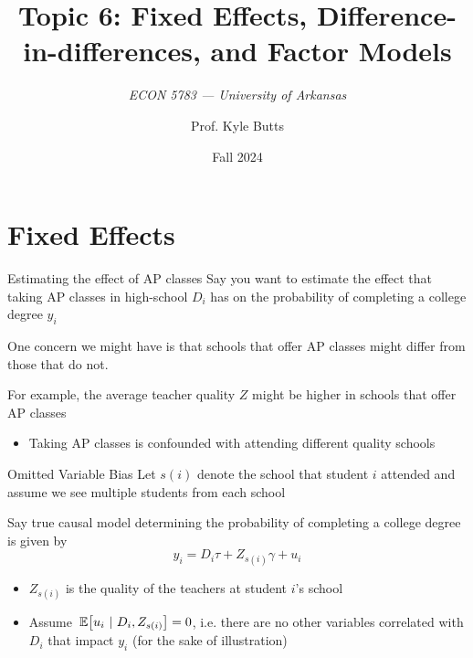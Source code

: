 \documentclass[aspectratio=169,t,11pt,table]{beamer}
\title{Topic 6: Fixed Effects, Difference-in-differences, and Factor Models}
\subtitle{\it  ECON 5783 — University of Arkansas}
\date{Fall 2024}
\author{Prof. Kyle Butts}
\begin{document}
\begin{frame}
\maketitle

\end{frame}

\section{Fixed Effects}

\begin{frame}{Estimating the effect of AP classes}
  Say you want to estimate the effect that taking AP classes in high-school $D_i$ has on the probability of completing a college degree $y_i$
  
  \bigskip
  One concern we might have is that schools that offer AP classes might differ from those that do not. 
  
  \pause
  \bigskip
  For example, the average teacher quality $Z$ might be higher in schools that offer AP classes
  \begin{itemize}
    \item Taking AP classes is confounded with attending different quality schools
  \end{itemize}
\end{frame}

\begin{frame}{Omitted Variable Bias}
  Let $s(i)$ denote the school that student $i$ attended and assume we see multiple students from each school

  \pause
  \bigskip
  Say true causal model determining the probability of completing a college degree is given by
  $$
    y_i = D_i \tau + Z_{s(i)} \gamma + u_i
  $$
  
  \begin{itemize}
    \item $Z_{s(i)}$ is the quality of the teachers at student $i$'s school
    
    \item Assume $\expec{u_i}{D_i, Z_{s(i)}} = 0$, i.e. there are no other variables correlated with $D_i$ that impact $y_i$ (for the sake of illustration)
  \end{itemize}
\end{frame}
\end{document}
